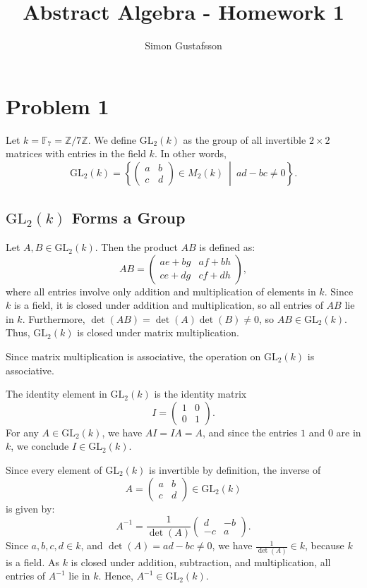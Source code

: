 \documentclass[12pt]{article}
\title{Abstract Algebra - Homework 1}
\author{Simon Gustafsson}
\date{}
\begin{document}
\maketitle
\section*{Problem 1}

Let \( k = \mathbb{F}_7 = \mathbb{Z}/7\mathbb{Z} \). We define \( \mathrm{GL}_2(k) \) as the group of all invertible \( 2 \times 2 \) matrices with entries in the field \( k \). In other words,
\[
\mathrm{GL}_2(k) = \left\{ \begin{pmatrix} a & b \\ c & d \end{pmatrix} \in M_2(k) \ \middle| \ ad - bc \neq 0 \right\}.
\]

\subsection*{\(\mathrm{GL}_2(k)\) Forms a Group}

Let \( A, B \in \mathrm{GL}_2(k) \). Then the product \( AB \) is defined as:
\[
AB = \begin{pmatrix}
ae + bg & af + bh \\
ce + dg & cf + dh
\end{pmatrix},
\]
where all entries involve only addition and multiplication of elements in \( k \). Since \( k \) is a field, it is closed under addition and multiplication, so all entries of \( AB \) lie in \( k \). Furthermore, \( \det(AB) = \det(A)\det(B) \neq 0 \), so \( AB \in \mathrm{GL}_2(k) \). Thus, \( \mathrm{GL}_2(k) \) is closed under matrix multiplication.

Since matrix multiplication is associative, the operation on \( \mathrm{GL}_2(k) \) is associative.

The identity element in \( \mathrm{GL}_2(k) \) is the identity matrix
\[
I = \begin{pmatrix} 1 & 0 \\ 0 & 1 \end{pmatrix}.
\]
For any \( A \in \mathrm{GL}_2(k) \), we have \( AI = IA = A \), and since the entries \( 1 \) and \( 0 \) are in \( k \), we conclude \( I \in \mathrm{GL}_2(k) \).

Since every element of \( \mathrm{GL}_2(k) \) is invertible by definition, the inverse of
\[
A = \begin{pmatrix} a & b \\ c & d \end{pmatrix} \in \mathrm{GL}_2(k)
\]
is given by:
\[
A^{-1} = \frac{1}{\det(A)} \begin{pmatrix} d & -b \\ -c & a \end{pmatrix}.
\]
Since \( a, b, c, d \in k \), and \( \det(A) = ad - bc \neq 0 \), we have \( \frac{1}{\det(A)} \in k \), because \( k \) is a field. As \( k \) is closed under addition, subtraction, and multiplication, all entries of \( A^{-1} \) lie in \( k \). Hence, \( A^{-1} \in \mathrm{GL}_2(k) \).
\end{document}

